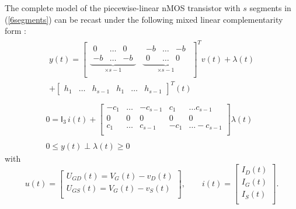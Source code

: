 The complete model of the piecewise-linear nMOS transistor with $s$ segments in (\ref{6segments}) can be recast under the following mixed linear complementarity form \cite{leenaerts-bokhoven1998}:
\begin{equation}
  \label{eq:68}
  \begin{array}{l}
    \begin{split}
      y(t) = \left[\begin{array}{cc} \underbrace{ \begin{array}{ccc}
              0 & \ldots & 0 \\
              -b & \ldots & -b
            \end{array}}_{\times s-1}
          &\underbrace{ \begin{array}{ccc}-b &\ldots & -b \\ 0 &\ldots & 0\end{array}}_{\times s-1} \\
        \end{array}\right]^T
      v(t) + \lambda(t) \\ + \left[\begin{array}{cccccc} h_1 &\ldots &
          h_{s-1} & h_1 &\ldots & h_{s-1}
        \end{array}
      \right]^T (t)
    \end{split}
\\ \\ 
 0 =
  \mathsf I_3\,
 i(t) 
 + 
 \left[\begin{array}{cccccc}
   -c_1  &\ldots & -c_{s-1} & c_1 &\ldots c_{s-1} \\
   0  & 0& 0 &0  & 0  \\
   c_{1}  &\ldots & c_{s-1} & -c_1 &\ldots -c_{s-1} \\
 \end{array}\right]
\lambda(t) \\ \\ 0 \leq y(t) \perp \lambda(t) \geq 0
\end{array}
\end{equation}
  with
\begin{equation}
  \label{eq:69}
  u(t) = 
  \left[\begin{array}{c}
    U_{GD}(t)=V_G(t)-v_D(t) \\
    U_{GS}(t)=V_G(t)-v_S(t) \\ 
  \end{array}\right],\quad\quad
i(t) = 
  \left[\begin{array}{c}
   I_D(t) \\
   I_G(t) \\
   I_S(t) \\
  \end{array}\right].
\end{equation}
